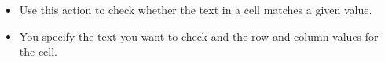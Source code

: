 
\begin{itemize}
\item Use this action to check whether the text in a cell matches a given value.
\item You specify the text you want to check and the row and column values for the cell.
\end{itemize}
